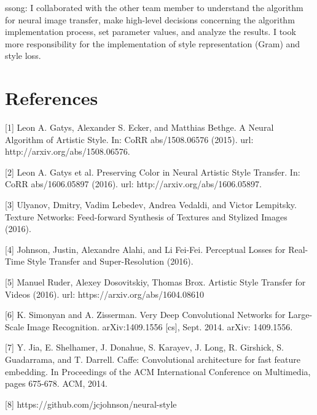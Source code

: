 \documentclass[10pt,twocolumn,letterpaper]{article}
\begin{document}
ssong: I collaborated with the other team member to understand the algorithm for neural image transfer, make high-level decisions concerning the algorithm implementation process, set parameter values, and analyze the results. I took more responsibility for the implementation of style representation (Gram) and style loss.

\section{References}

[1] Leon A. Gatys, Alexander S. Ecker, and Matthias Bethge. A Neural Algorithm of Artistic Style. In: CoRR abs/1508.06576 (2015). url: http://arxiv.org/abs/1508.06576.

[2] Leon A. Gatys et al. Preserving Color in Neural Artistic Style Transfer. In: CoRR abs/1606.05897 (2016). url: http://arxiv.org/abs/1606.05897.

[3] Ulyanov, Dmitry, Vadim Lebedev, Andrea Vedaldi, and Victor Lempitsky. Texture Networks: Feed-forward Synthesis of Textures and Stylized Images (2016).

[4] Johnson, Justin, Alexandre Alahi, and Li Fei-Fei. Perceptual Losses for Real-Time Style Transfer and Super-Resolution (2016).

[5] Manuel Ruder, Alexey Dosovitskiy, Thomas Brox. Artistic Style Transfer for Videos (2016). url: https://arxiv.org/abs/1604.08610

[6] K. Simonyan and A. Zisserman. Very Deep Convolutional Networks for Large-Scale Image Recognition. arXiv:1409.1556 [cs], Sept. 2014. arXiv: 1409.1556.

[7] Y. Jia, E. Shelhamer, J. Donahue, S. Karayev, J. Long, R. Girshick, S. Guadarrama, and T. Darrell. Caffe: Convolutional
architecture for fast feature embedding. In Proceedings of the ACM International Conference on Multimedia, pages 675-678. ACM, 2014.

[8] https://github.com/jcjohnson/neural-style



{\small


}
\end{document}
